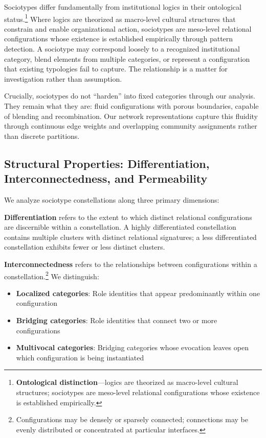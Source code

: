 \documentclass[../main.tex]{subfiles}
\begin{document}
Sociotypes differ fundamentally from institutional logics in their ontological status.\footnote{\textbf{Ontological distinction}---logics are theorized as macro-level cultural structures; sociotypes are meso-level relational configurations whose existence is established empirically.} Where logics are theorized as macro-level cultural structures that constrain and enable organizational action, sociotypes are meso-level relational configurations whose existence is established empirically through pattern detection. A sociotype may correspond loosely to a recognized institutional category, blend elements from multiple categories, or represent a configuration that existing typologies fail to capture. The relationship is a matter for investigation rather than assumption.

Crucially, sociotypes do not ``harden'' into fixed categories through our analysis. They remain what they are: fluid configurations with porous boundaries, capable of blending and recombination. Our network representations capture this fluidity through continuous edge weights and overlapping community assignments rather than discrete partitions.

\subsection{Structural Properties: Differentiation, Interconnectedness, and Permeability}

We analyze sociotype constellations along three primary dimensions:

\textbf{Differentiation} refers to the extent to which distinct relational configurations are discernible within a constellation. A highly differentiated constellation contains multiple clusters with distinct relational signatures; a less differentiated constellation exhibits fewer or less distinct clusters.

\textbf{Interconnectedness} refers to the relationships between configurations within a constellation.\footnote{Configurations may be densely or sparsely connected; connections may be evenly distributed or concentrated at particular interfaces.} We distinguish:

\begin{itemize}
    \item \textbf{Localized categories}: Role identities that appear predominantly within one configuration
    \item \textbf{Bridging categories}: Role identities that connect two or more configurations
    \item \textbf{Multivocal categories}: Bridging categories whose evocation leaves open which configuration is being instantiated
\end{itemize}
\end{document}

